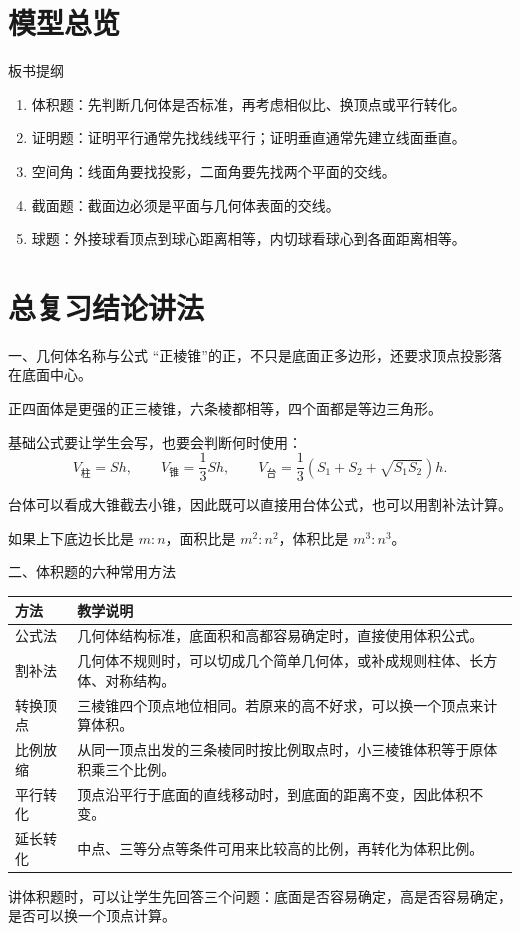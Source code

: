 \documentclass[11pt,a4paper]{ctexart}
\begin{document}
\section{模型总览}

\begin{teachbox}{板书提纲}
\begin{enumerate}[label=\arabic*. , leftmargin=2em, itemsep=0.35em]
  \item 体积题：先判断几何体是否标准，再考虑相似比、换顶点或平行转化。
  \item 证明题：证明平行通常先找线线平行；证明垂直通常先建立线面垂直。
  \item 空间角：线面角要找投影，二面角要先找两个平面的交线。
  \item 截面题：截面边必须是平面与几何体表面的交线。
  \item 球题：外接球看顶点到球心距离相等，内切球看球心到各面距离相等。
\end{enumerate}
\end{teachbox}

\section{总复习结论讲法}

\begin{teachbox}{一、几何体名称与公式}
“正棱锥”的正，不只是底面正多边形，还要求顶点投影落在底面中心。

正四面体是更强的正三棱锥，六条棱都相等，四个面都是等边三角形。

基础公式要让学生会写，也要会判断何时使用：
\[
  V_{\text{柱}}=Sh,
  \qquad
  V_{\text{锥}}=\frac13Sh,
  \qquad
  V_{\text{台}}=\frac13(S_1+S_2+\sqrt{S_1S_2})h.
\]

台体可以看成大锥截去小锥，因此既可以直接用台体公式，也可以用割补法计算。

如果上下底边长比是 \(m:n\)，面积比是 \(m^2:n^2\)，体积比是 \(m^3:n^3\)。
\end{teachbox}

\begin{teachbox}{二、体积题的六种常用方法}
\renewcommand{\arraystretch}{1.35}
\begin{tabularx}{\textwidth}{p{2.7cm}X}
\toprule
方法 & 教学说明 \\
\midrule
公式法 & 几何体结构标准，底面积和高都容易确定时，直接使用体积公式。\\ \hline
割补法 & 几何体不规则时，可以切成几个简单几何体，或补成规则柱体、长方体、对称结构。\\ \hline
转换顶点 & 三棱锥四个顶点地位相同。若原来的高不好求，可以换一个顶点来计算体积。\\ \hline
比例放缩 & 从同一顶点出发的三条棱同时按比例取点时，小三棱锥体积等于原体积乘三个比例。\\ \hline
平行转化 & 顶点沿平行于底面的直线移动时，到底面的距离不变，因此体积不变。\\ \hline
延长转化 & 中点、三等分点等条件可用来比较高的比例，再转化为体积比例。\\
\bottomrule
\end{tabularx}

讲体积题时，可以让学生先回答三个问题：底面是否容易确定，高是否容易确定，是否可以换一个顶点计算。
\end{teachbox}
\end{document}
